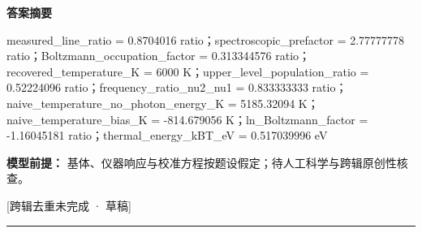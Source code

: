 \documentclass[UTF8,11pt,a4paper]{ctexart}
\begin{document}
\noindent\textbf{答案摘要}\par
measured\_line\_ratio = 0.8704016 ratio；spectroscopic\_prefactor = 2.77777778 ratio；Boltzmann\_occupation\_factor = 0.313344576 ratio；recovered\_temperature\_K = 6000 K；upper\_level\_population\_ratio = 0.52224096 ratio；frequency\_ratio\_nu2\_nu1 = 0.833333333 ratio；naive\_temperature\_no\_photon\_energy\_K = 5185.32094 K；naive\_temperature\_bias\_K = -814.679056 K；ln\_Boltzmann\_factor = -1.16045181 ratio；thermal\_energy\_kBT\_eV = 0.517039996 eV\par
\noindent\textbf{模型前提：}
基体、仪器响应与校准方程按题设假定；待人工科学与跨辑原创性核查。\par
\noindent\textcolor{red!65!black}{[跨辑去重未完成 · 草稿]} \par
\medskip\hrule\medskip
{}
\end{document}
